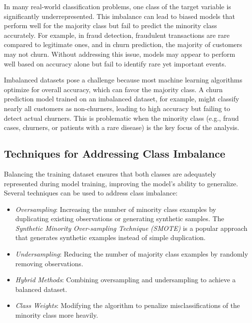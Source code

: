 \documentclass[
  11pt,
]{book}
\providecommand{\tightlist}{%
  \setlength{\itemsep}{0pt}\setlength{\parskip}{0pt}}
\theoremstyle{definition}
\theoremstyle{definition}
\theoremstyle{definition}
\theoremstyle{definition}
\theoremstyle{remark}
\begin{document}
In many real-world classification problems, one class of the target variable is significantly underrepresented. This imbalance can lead to biased models that perform well for the majority class but fail to predict the minority class accurately. For example, in fraud detection, fraudulent transactions are rare compared to legitimate ones, and in churn prediction, the majority of customers may not churn. Without addressing this issue, models may appear to perform well based on accuracy alone but fail to identify rare yet important events.

Imbalanced datasets pose a challenge because most machine learning algorithms optimize for overall accuracy, which can favor the majority class. A churn prediction model trained on an imbalanced dataset, for example, might classify nearly all customers as non-churners, leading to high accuracy but failing to detect actual churners. This is problematic when the minority class (e.g., fraud cases, churners, or patients with a rare disease) is the key focus of the analysis.

\subsection*{Techniques for Addressing Class Imbalance}\label{techniques-for-addressing-class-imbalance}


Balancing the training dataset ensures that both classes are adequately represented during model training, improving the model's ability to generalize. Several techniques can be used to address class imbalance:

\begin{itemize}
\tightlist
\item
  \emph{Oversampling}: Increasing the number of minority class examples by duplicating existing observations or generating synthetic samples. The \emph{Synthetic Minority Over-sampling Technique (SMOTE)} is a popular approach that generates synthetic examples instead of simple duplication.
\item
  \emph{Undersampling}: Reducing the number of majority class examples by randomly removing observations.
\item
  \emph{Hybrid Methods}: Combining oversampling and undersampling to achieve a balanced dataset.
\item
  \emph{Class Weights}: Modifying the algorithm to penalize misclassifications of the minority class more heavily.
\end{itemize}
\end{document}
